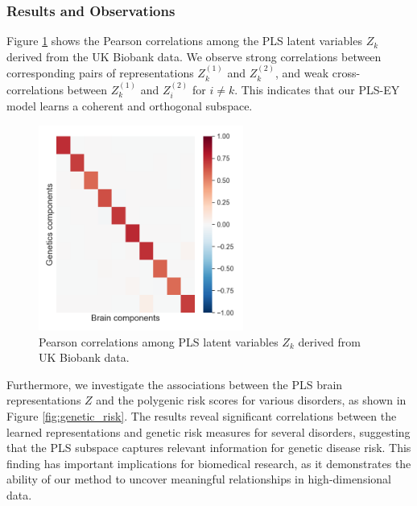 \subsubsection{Results and Observations}
Figure \ref{fig:UKBB_corr} shows the Pearson correlations among the PLS latent variables $Z_k$ derived from the UK Biobank data. We observe strong correlations between corresponding pairs of representations $Z^{(1)}_k$ and $Z^{(2)}_k$, and weak cross-correlations between $Z^{(1)}_k$ and $Z^{(2)}_i$ for $i \neq k$. This indicates that our PLS-EY model learns a coherent and orthogonal subspace.
\begin{figure}
\centering
\includegraphics[width=0.6\textwidth,trim={0.8cm 0cm 0.3cm 0cm}]{figures/UKBB/cross_corr.png}
\caption{Pearson correlations among PLS latent variables $Z_k$ derived from UK Biobank data.}
\label{fig:UKBB_corr}
\end{figure}
Furthermore, we investigate the associations between the PLS brain representations $Z$ and the polygenic risk scores for various disorders, as shown in Figure \ref{fig:genetic_risk}. The results reveal significant correlations between the learned representations and genetic risk measures for several disorders, suggesting that the PLS subspace captures relevant information for genetic disease risk. This finding has important implications for biomedical research, as it demonstrates the ability of our method to uncover meaningful relationships in high-dimensional data.
